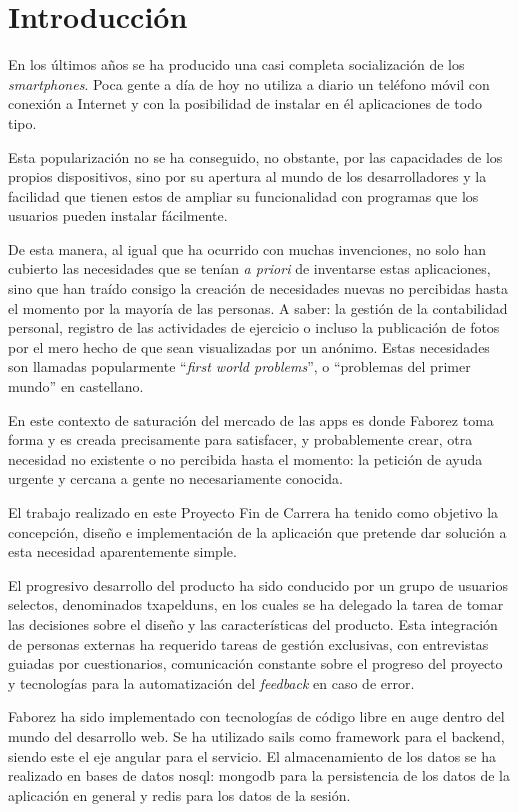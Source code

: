 \documentclass[main]{subfiles}
\begin{document}
\chapter{Introducción}

En los últimos años se ha producido una casi completa socialización de los \emph{smartphones}. Poca gente a día de hoy no utiliza a diario un teléfono móvil con conexión a Internet y con la posibilidad de instalar en él aplicaciones de todo tipo.

Esta popularización no se ha conseguido, no obstante, por las capacidades de los propios dispositivos, sino por su apertura al mundo de los desarrolladores y la facilidad que tienen estos de ampliar su funcionalidad con programas que los usuarios pueden instalar fácilmente.

De esta manera, al igual que ha ocurrido con muchas invenciones, no solo han cubierto las necesidades que se tenían \emph{a priori} de inventarse estas aplicaciones, sino que han traído consigo la creación de necesidades nuevas no percibidas hasta el momento por la mayoría de las personas. A saber: la gestión de la contabilidad personal, registro de las actividades de ejercicio o incluso la publicación de fotos por el mero hecho de que sean visualizadas por un anónimo. Estas necesidades son llamadas popularmente \enquote{\emph{first world problems}}, o \enquote{problemas del primer mundo} en castellano.

En este contexto de saturación del mercado de las \glspl{app} es donde Faborez toma forma y es creada precisamente para satisfacer, y probablemente crear, otra necesidad no existente o no percibida hasta el momento: la petición de ayuda urgente y cercana a gente no necesariamente conocida.

El trabajo realizado en este Proyecto Fin de Carrera ha tenido como objetivo la concepción, diseño e implementación de la aplicación que pretende dar solución a esta necesidad aparentemente simple.

El progresivo desarrollo del producto ha sido conducido por un grupo de usuarios selectos, denominados \glspl{txapeldun}, en los cuales se ha delegado la tarea de tomar las decisiones sobre el diseño y las características del producto. Esta integración de personas externas ha requerido tareas de gestión exclusivas, con entrevistas guiadas por cuestionarios, comunicación constante sobre el progreso del proyecto y tecnologías para la automatización del \emph{feedback} en caso de error.

Faborez ha sido implementado con tecnologías de código libre en auge dentro del mundo del desarrollo web. Se ha utilizado \gls{sails} como \gls{framework} para el \gls{backend}, siendo este el eje angular para el servicio. El almacenamiento de los datos se ha realizado en bases de datos \gls{nosql}: \gls{mongodb} para la persistencia de los datos de la aplicación en general y \gls{redis} para los datos de la sesión.
\end{document}
